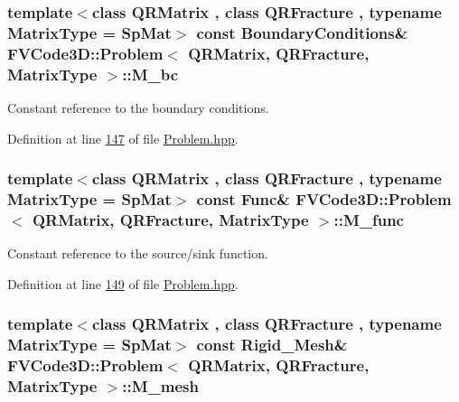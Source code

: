 \subsubsection[{\texorpdfstring{M\+\_\+bc}{M_bc}}]{\setlength{\rightskip}{0pt plus 5cm}template$<$class Q\+R\+Matrix , class Q\+R\+Fracture , typename Matrix\+Type  = Sp\+Mat$>$ const {\bf Boundary\+Conditions}\& {\bf F\+V\+Code3\+D\+::\+Problem}$<$ Q\+R\+Matrix, Q\+R\+Fracture, Matrix\+Type $>$\+::M\+\_\+bc\hspace{0.3cm}{\ttfamily [protected]}}\hypertarget{classFVCode3D_1_1Problem_a6cfbed984a9986876230b643d6c28cee}{}\label{classFVCode3D_1_1Problem_a6cfbed984a9986876230b643d6c28cee}


Constant reference to the boundary conditions. 



Definition at line \hyperlink{Problem_8hpp_source_l00147}{147} of file \hyperlink{Problem_8hpp_source}{Problem.\+hpp}.

\subsubsection[{\texorpdfstring{M\+\_\+func}{M_func}}]{\setlength{\rightskip}{0pt plus 5cm}template$<$class Q\+R\+Matrix , class Q\+R\+Fracture , typename Matrix\+Type  = Sp\+Mat$>$ const {\bf Func}\& {\bf F\+V\+Code3\+D\+::\+Problem}$<$ Q\+R\+Matrix, Q\+R\+Fracture, Matrix\+Type $>$\+::M\+\_\+func\hspace{0.3cm}{\ttfamily [protected]}}\hypertarget{classFVCode3D_1_1Problem_a8d2a09d302c312ce0fadb00b8ac7ecf7}{}\label{classFVCode3D_1_1Problem_a8d2a09d302c312ce0fadb00b8ac7ecf7}


Constant reference to the source/sink function. 



Definition at line \hyperlink{Problem_8hpp_source_l00149}{149} of file \hyperlink{Problem_8hpp_source}{Problem.\+hpp}.

\subsubsection[{\texorpdfstring{M\+\_\+mesh}{M_mesh}}]{\setlength{\rightskip}{0pt plus 5cm}template$<$class Q\+R\+Matrix , class Q\+R\+Fracture , typename Matrix\+Type  = Sp\+Mat$>$ const {\bf Rigid\+\_\+\+Mesh}\& {\bf F\+V\+Code3\+D\+::\+Problem}$<$ Q\+R\+Matrix, Q\+R\+Fracture, Matrix\+Type $>$\+::M\+\_\+mesh\hspace{0.3cm}{\ttfamily [protected]}}\hypertarget{classFVCode3D_1_1Problem_aa3c9a2cf8ccd899314cf22d907a0041f}{}\label{classFVCode3D_1_1Problem_aa3c9a2cf8ccd899314cf22d907a0041f}


